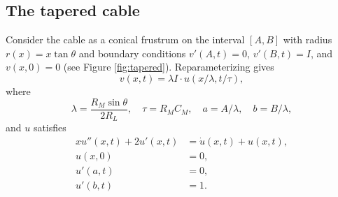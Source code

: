 \documentclass[parskip=half]{scrartcl}
\theoremstyle{nonumberplain}
\begin{document}
\subsection{The tapered cable}

Consider the cable as a conical frustrum on the interval $[A, B]$ with radius
$r(x) = x \tan\theta$ and boundary conditions $v'(A, t) = 0$, $v'(B, t) = I$,
and $v(x, 0) = 0$ (see Figure \ref{fig:tapered}). Reparameterizing gives
\begin{equation}
    v(x, t) = \lambda I\cdot u(x/\lambda, t/\tau),
\end{equation}
where
\begin{equation}
    \lambda = \frac{R_M\sin\theta}{2 R_L}, \quad \tau = R_M C_M, \quad a = A/\lambda, \quad b = B/\lambda,
\end{equation}
and $u$ satisfies
\begin{equation}
    \label{eq:conu}
    \begin{aligned}
        x u''(x, t) + 2 u'(x, t) &= \dot u(x, t) + u(x, t),\\
        u(x, 0) &= 0,\\
        u'(a, t) &= 0,\\
        u'(b, t) &= 1.
    \end{aligned}
\end{equation}
\end{document}
